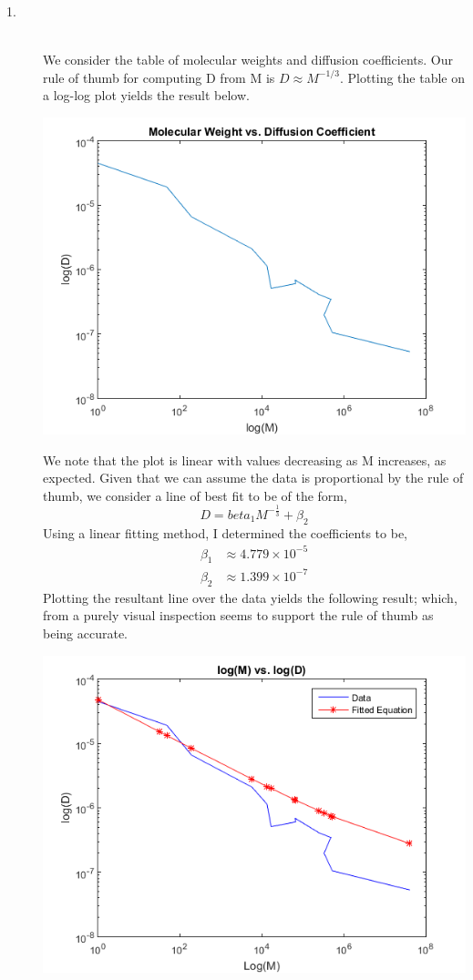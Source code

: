 \documentclass[letterpaper,10pt]{article}
\begin{document}
\begin{description}
\item[1.]\hfill \\
We consider the table of molecular weights and diffusion coefficients. Our rule of thumb for computing D from M is $D\approx M^{-1/3}$. Plotting the table on a log-log plot yields the result below.
\begin{center}
\includegraphics{pureplot.png}
\end{center}
We note that the plot is linear with values decreasing as M increases, as expected. Given that we can assume the data is proportional by the rule of thumb, we consider a line of best fit to be of the form,
\[D=beta_1M^{-\frac{1}{3}}+\beta_2\]
Using a linear fitting method, I determined the coefficients to be,
\begin{align*}
\beta_1 &\approx 4.779\times 10^{-5}\\
\beta_2 &\approx 1.399\times 10^{-7}
\end{align*}
Plotting the resultant line over the data yields the following result; which, from a purely visual inspection seems to support the rule of thumb as being accurate.
\begin{center}
\includegraphics{bestfit.png}
\end{center}
\end{description}
\end{document}
